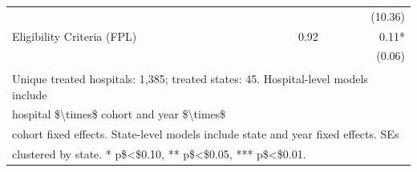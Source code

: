 \begin{table}[!h]
\begin{tabular}[t]{lrr}
\hspace{1em} &  & (10.36)\\
\hspace{1em}Eligibility Criteria (FPL) & 0.92 & 0.11*\\
\hspace{1em} &  & (0.06)\\
\bottomrule
\multicolumn{3}{l}{\textsuperscript{} Unique treated hospitals: 1,385; treated states: 45. Hospital-level models include}\\
\multicolumn{3}{l}{hospital \$\textbackslash{}times\$ cohort and year \$\textbackslash{}times\$}\\
\multicolumn{3}{l}{cohort fixed effects. State-level models include state and year fixed effects. SEs}\\
\multicolumn{3}{l}{clustered by state. * p\$<\$0.10, ** p\$<\$0.05, *** p\$<\$0.01.}\\
\end{tabular}
\end{table}
